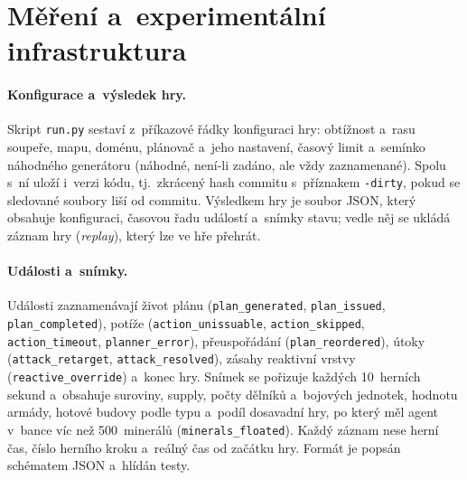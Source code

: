 \section{Měření a~experimentální infrastruktura}
\label{sec:harness}

\paragraph{Konfigurace a~výsledek hry.} Skript \texttt{run.py} sestaví z~příkazové řádky konfiguraci hry: obtížnost a~rasu soupeře, mapu, doménu, plánovač a~jeho nastavení, časový limit a~semínko náhodného generátoru (náhodné, není-li zadáno, ale vždy zaznamenané). Spolu s~ní uloží i~verzi kódu, tj.~zkrácený hash commitu s~příznakem \texttt{-dirty}, pokud se sledované soubory liší od commitu. Výsledkem hry je soubor JSON, který obsahuje konfiguraci, časovou řadu událostí a~snímky stavu; vedle něj se ukládá záznam hry (\emph{replay}), který lze ve hře přehrát.

\paragraph{Události a~snímky.} Události zaznamenávají život plánu (\nolinkurl{plan_generated}, \nolinkurl{plan_issued}, \nolinkurl{plan_completed}), potíže (\nolinkurl{action_unissuable}, \nolinkurl{action_skipped}, \nolinkurl{action_timeout}, \nolinkurl{planner_error}), přeuspořádání (\nolinkurl{plan_reordered}), útoky (\nolinkurl{attack_retarget}, \nolinkurl{attack_resolved}), zásahy reaktivní vrstvy (\nolinkurl{reactive_override}) a~konec hry. Snímek se pořizuje každých 10~herních sekund a~obsahuje suroviny, supply, počty dělníků a~bojových jednotek, hodnotu armády, hotové budovy podle typu a~podíl dosavadní hry, po který měl agent v~bance víc než 500~minerálů (\nolinkurl{minerals_floated}). Každý záznam nese herní čas, číslo herního kroku a~reálný čas od začátku hry. Formát je popsán schématem JSON a~hlídán testy.

